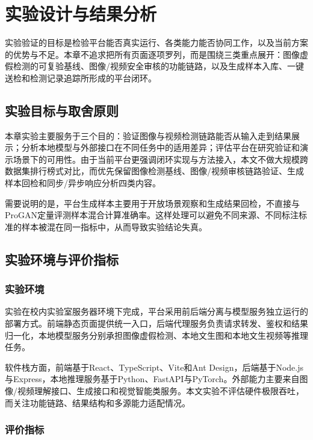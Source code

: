 
\chapter{实验设计与结果分析}

实验验证的目标是检验平台能否真实运行、各类能力能否协同工作，以及当前方案的优势与不足。本章不追求把所有页面逐项罗列，而是围绕三类重点展开：图像虚假检测的可复验基线、图像/视频安全审核的功能链路，以及生成样本入库、一键送检和检测记录追踪所形成的平台闭环。

\section{实验目标与取舍原则}

本章实验主要服务于三个目的：验证图像与视频检测链路能否从输入走到结果展示；分析本地模型与外部接口在不同任务中的适用差异；评估平台在研究验证和演示场景下的可用性。由于当前平台更强调闭环实现与方法接入，本文不做大规模跨数据集排行榜式对比，而优先保留图像检测基线、图像/视频审核链路验证、生成样本回检和同步/异步响应分析四类内容。

需要说明的是，平台生成样本主要用于开放场景观察和生成结果回检，不直接与ProGAN定量评测样本混合计算准确率。这样处理可以避免不同来源、不同标注标准的样本被混在同一指标中，从而导致实验结论失真。

\section{实验环境与评价指标}

\subsection{实验环境}

实验在校内实验室服务器环境下完成，平台采用前后端分离与模型服务独立运行的部署方式。前端静态页面提供统一入口，后端代理服务负责请求转发、鉴权和结果归一化，本地模型服务分别承担图像虚假检测、本地文生图和本地文生视频等推理任务。

软件栈方面，前端基于React、TypeScript、Vite和Ant Design，后端基于Node.js与Express，本地推理服务基于Python、FastAPI与PyTorch。外部能力主要来自图像/视频理解接口、生成接口和视觉智能类服务。本文实验不评估硬件极限吞吐，而关注功能链路、结果结构和多源能力适配情况。

\subsection{评价指标}

